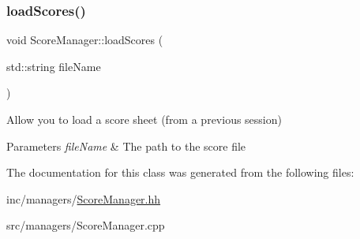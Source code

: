 \subsubsection{\texorpdfstring{load\+Scores()}{loadScores()}}
{\footnotesize\ttfamily void Score\+Manager\+::load\+Scores (\begin{DoxyParamCaption}\item[{std\+::string}]{file\+Name }\end{DoxyParamCaption})}



Allow you to load a score sheet (from a previous session) 


\begin{DoxyParams}{Parameters}
{\em file\+Name} & The path to the score file \\
\hline
\end{DoxyParams}


The documentation for this class was generated from the following files\+:\begin{DoxyCompactItemize}
\item 
inc/managers/\hyperlink{ScoreManager_8hh}{Score\+Manager.\+hh}\item 
src/managers/Score\+Manager.\+cpp\end{DoxyCompactItemize}
